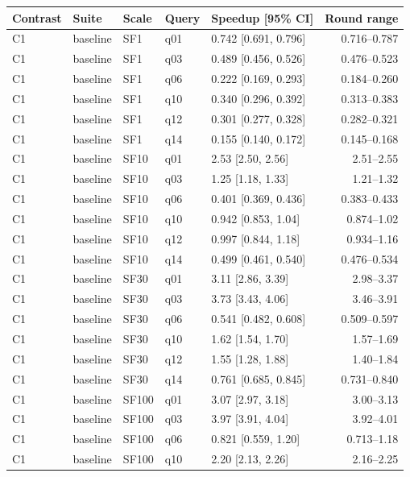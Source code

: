 \begin{longtable}{lllllr}
\toprule
Contrast & Suite & Scale & Query & Speedup [95\% CI] & Round range \\
\midrule
\endhead
\bottomrule
\endfoot
C1 & baseline & SF1 & q01 & 0.742 [0.691, 0.796] & 0.716--0.787 \\
C1 & baseline & SF1 & q03 & 0.489 [0.456, 0.526] & 0.476--0.523 \\
C1 & baseline & SF1 & q06 & 0.222 [0.169, 0.293] & 0.184--0.260 \\
C1 & baseline & SF1 & q10 & 0.340 [0.296, 0.392] & 0.313--0.383 \\
C1 & baseline & SF1 & q12 & 0.301 [0.277, 0.328] & 0.282--0.321 \\
C1 & baseline & SF1 & q14 & 0.155 [0.140, 0.172] & 0.145--0.168 \\
C1 & baseline & SF10 & q01 & 2.53 [2.50, 2.56] & 2.51--2.55 \\
C1 & baseline & SF10 & q03 & 1.25 [1.18, 1.33] & 1.21--1.32 \\
C1 & baseline & SF10 & q06 & 0.401 [0.369, 0.436] & 0.383--0.433 \\
C1 & baseline & SF10 & q10 & 0.942 [0.853, 1.04] & 0.874--1.02 \\
C1 & baseline & SF10 & q12 & 0.997 [0.844, 1.18] & 0.934--1.16 \\
C1 & baseline & SF10 & q14 & 0.499 [0.461, 0.540] & 0.476--0.534 \\
C1 & baseline & SF30 & q01 & 3.11 [2.86, 3.39] & 2.98--3.37 \\
C1 & baseline & SF30 & q03 & 3.73 [3.43, 4.06] & 3.46--3.91 \\
C1 & baseline & SF30 & q06 & 0.541 [0.482, 0.608] & 0.509--0.597 \\
C1 & baseline & SF30 & q10 & 1.62 [1.54, 1.70] & 1.57--1.69 \\
C1 & baseline & SF30 & q12 & 1.55 [1.28, 1.88] & 1.40--1.84 \\
C1 & baseline & SF30 & q14 & 0.761 [0.685, 0.845] & 0.731--0.840 \\
C1 & baseline & SF100 & q01 & 3.07 [2.97, 3.18] & 3.00--3.13 \\
C1 & baseline & SF100 & q03 & 3.97 [3.91, 4.04] & 3.92--4.01 \\
C1 & baseline & SF100 & q06 & 0.821 [0.559, 1.20] & 0.713--1.18 \\
C1 & baseline & SF100 & q10 & 2.20 [2.13, 2.26] & 2.16--2.25 \\

\end{longtable}
